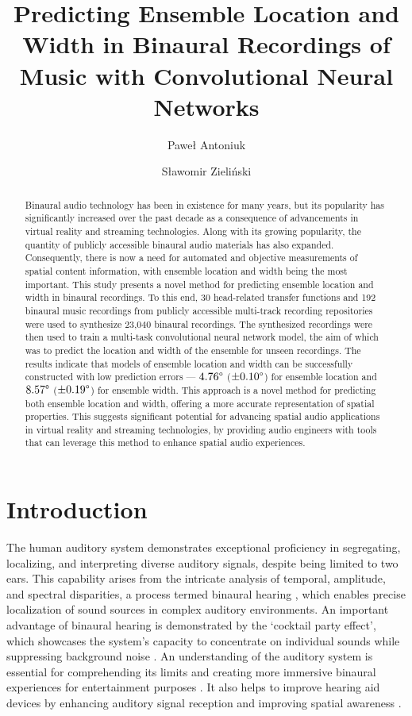 \documentclass{article}
\title{Predicting Ensemble Location and Width in Binaural Recordings of Music with Convolutional Neural Networks}
\author[1,*]{Paweł Antoniuk}
\author[1]{Sławomir Zieliński}
\affil[1]{Faculty of Computer Science, Białystok University of Technology}
\affil[*]{Corresponding author: pawel.antoniuk@sd.pb.edu.pl}
\date{}
\begin{document}
\maketitle

\begin{abstract}
  Binaural audio technology has been in existence for many years, but its popularity has significantly increased over the past decade as a consequence of advancements in virtual reality and streaming technologies. Along with its growing popularity, the quantity of publicly accessible binaural audio materials has also expanded. Consequently, there is now a need for automated and objective measurements of spatial content information, with ensemble location and width being the most important. This study presents a novel method for predicting ensemble location and width in binaural recordings. To this end, 30 head-related transfer functions and 192 binaural music recordings from publicly accessible multi-track recording repositories were used to synthesize 23,040 binaural recordings. The synthesized recordings were then used to train a multi-task convolutional neural network model, the aim of which was to predict the location and width of the ensemble for unseen recordings. The results indicate that models of ensemble location and width can be successfully constructed with low prediction errors --- $4.76\degree$ ($\pm0.10\degree$) for ensemble location and $8.57\degree$ ($\pm0.19\degree$) for ensemble width. This approach is a novel method for predicting both ensemble location and width, offering a more accurate representation of spatial properties. This suggests significant potential for advancing spatial audio applications in virtual reality and streaming technologies, by providing audio engineers with tools that can leverage this method to enhance spatial audio experiences.
\end{abstract}

\section{Introduction}

The human auditory system demonstrates exceptional proficiency in segregating, localizing, and interpreting diverse auditory signals, despite being limited to two ears. This capability arises from the intricate analysis of temporal, amplitude, and spectral disparities, a process termed binaural hearing \cite{blauert_spatial_1996}, which enables precise localization of sound sources in complex auditory environments. An important advantage of binaural hearing is demonstrated by the `cocktail party effect', which showcases the system's capacity to concentrate on individual sounds while suppressing background noise \cite{cherry_experiments_1953}. An understanding of the auditory system is essential for comprehending its limits and creating more immersive binaural experiences for entertainment purposes \cite{zhang_surround_2017}. It also helps to improve hearing aid devices by enhancing auditory signal reception and improving spatial awareness \cite{hirsh_binaural_1950, thiemann_speech_2016}.
\end{document}
